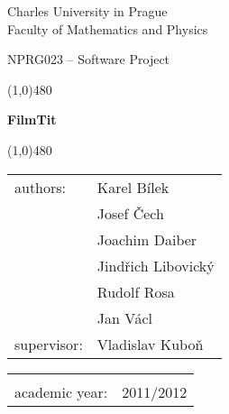 \begin{titlepage}
\begin{center}
\sc \Large Charles University in Prague \\
Faculty of Mathematics and Physics
\end{center}

\vspace{0.5cm}

\begin{center}
\huge NPRG023 -- Software Project
\end{center}

\vspace{1.5cm}

\noindent\line(1,0){480}

\vspace{0.3cm}

\begin{center}
\hfill\fontsize{40mm}{40mm}\bf\sf FilmTit
\end{center}

\noindent\line(1,0){480}

\vspace{5.25cm}

{\noindent\Large
\begin{tabular}{ll}
authors: & Karel Bílek \\
& Josef Čech \\
& Joachim Daiber \\
& Jindřich Libovický \\
& Rudolf Rosa \\
& Jan Václ\vspace*{0.4cm} \\
supervisor: & Vladislav Kuboň
\end{tabular}
\hfill\begin{tabular}{ll}
\vspace*{3.4cm}& \\
academic year: & 2011/2012\\
\end{tabular}}


\end{titlepage}

